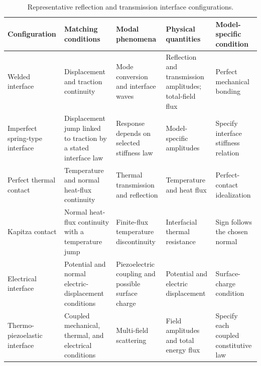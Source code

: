 \begin{table}[htbp]
\centering
\small
\setlength{\tabcolsep}{3pt}
\caption{Representative reflection and transmission interface configurations.}
\label{tab:T6-interfaces}
\begin{tabularx}{\textwidth}{@{}p{2.4cm}YYYY@{}}
\toprule
\textbf{Configuration} & \textbf{Matching conditions} & \textbf{Modal phenomena} & \textbf{Physical quantities} & \textbf{Model-specific condition} \\
\midrule
Welded interface & Displacement and traction continuity & Mode conversion and interface waves & Reflection and transmission amplitudes; total-field flux & Perfect mechanical bonding \\
Imperfect spring-type interface & Displacement jump linked to traction by a stated interface law & Response depends on selected stiffness law & Model-specific amplitudes & Specify interface stiffness relation \\
Perfect thermal contact & Temperature and normal heat-flux continuity & Thermal transmission and reflection & Temperature and heat flux & Perfect-contact idealization \\
Kapitza contact & Normal heat-flux continuity with a temperature jump & Finite-flux temperature discontinuity & Interfacial thermal resistance & Sign follows the chosen normal \\
Electrical interface & Potential and normal electric-displacement conditions & Piezoelectric coupling and possible surface charge & Potential and electric displacement & Surface-charge condition \\
Thermo-piezoelastic interface & Coupled mechanical, thermal, and electrical conditions & Multi-field scattering & Field amplitudes and total energy flux & Specify each coupled constitutive law \\
\bottomrule
\end{tabularx}
\par{}
\end{table}
